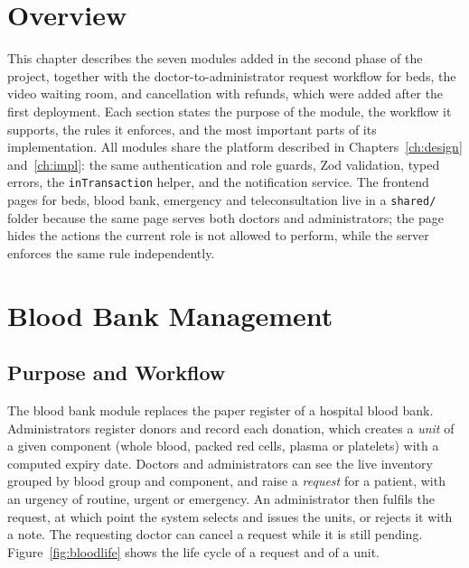 \FloatBarrier
\section{Overview}

This chapter describes the seven modules added in the second phase of the project, together with the doctor-to-administrator request workflow for beds, the video waiting room, and cancellation with refunds, which were added after the first deployment. Each section states the purpose of the module, the workflow it supports, the rules it enforces, and the most important parts of its implementation. All modules share the platform described in Chapters~\ref{ch:design} and~\ref{ch:impl}: the same authentication and role guards, Zod validation, typed errors, the \texttt{inTransaction} helper, and the notification service. The frontend pages for beds, blood bank, emergency and teleconsultation live in a \texttt{shared/} folder because the same page serves both doctors and administrators; the page hides the actions the current role is not allowed to perform, while the server enforces the same rule independently.

\FloatBarrier
\section{Blood Bank Management}
\label{sec:mod-blood}

\subsection{Purpose and Workflow}

The blood bank module replaces the paper register of a hospital blood bank. Administrators register donors and record each donation, which creates a \emph{unit} of a given component (whole blood, packed red cells, plasma or platelets) with a computed expiry date. Doctors and administrators can see the live inventory grouped by blood group and component, and raise a \emph{request} for a patient, with an urgency of routine, urgent or emergency. An administrator then fulfils the request, at which point the system selects and issues the units, or rejects it with a note. The requesting doctor can cancel a request while it is still pending. Figure~\ref{fig:bloodlife} shows the life cycle of a request and of a unit.

